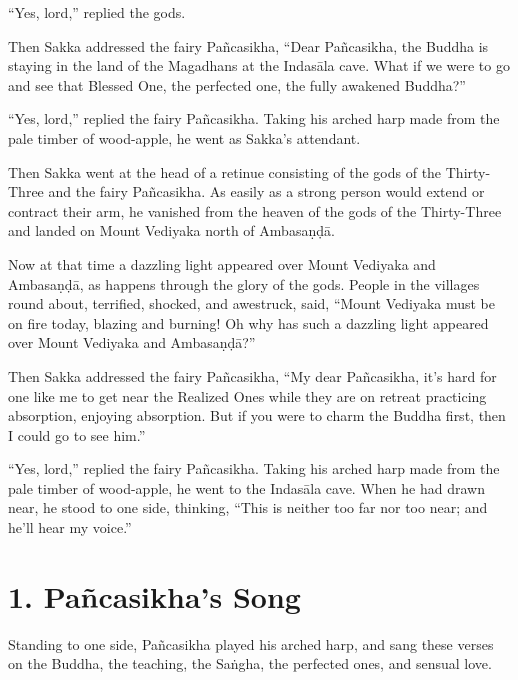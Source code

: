 \documentclass[12pt,openany]{book}%
\begin{document}
“Yes, lord,” replied the gods. 

Then Sakka addressed the fairy \textsanskrit{Pañcasikha}, “Dear \textsanskrit{Pañcasikha}, the Buddha is staying in the land of the Magadhans at the \textsanskrit{Indasāla} cave. What if we were to go and see that Blessed One, the perfected one, the fully awakened Buddha?” 

“Yes, lord,” replied the fairy \textsanskrit{Pañcasikha}. Taking his arched harp made from the pale timber of wood-apple, he went as Sakka’s attendant. 

Then Sakka went at the head of a retinue consisting of the gods of the Thirty-Three and the fairy \textsanskrit{Pañcasikha}. As easily as a strong person would extend or contract their arm, he vanished from the heaven of the gods of the Thirty-Three and landed on Mount Vediyaka north of \textsanskrit{Ambasaṇḍā}. 

Now at that time a dazzling light appeared over Mount Vediyaka and \textsanskrit{Ambasaṇḍā}, as happens through the glory of the gods. People in the villages round about, terrified, shocked, and awestruck, said, “Mount Vediyaka must be on fire today, blazing and burning! Oh why has such a dazzling light appeared over Mount Vediyaka and \textsanskrit{Ambasaṇḍā}?” 

Then Sakka addressed the fairy \textsanskrit{Pañcasikha}, “My dear \textsanskrit{Pañcasikha}, it’s hard for one like me to get near the Realized Ones while they are on retreat practicing absorption, enjoying absorption. But if you were to charm the Buddha first, then I could go to see him.” 

“Yes, lord,” replied the fairy \textsanskrit{Pañcasikha}. Taking his arched harp made from the pale timber of wood-apple, he went to the \textsanskrit{Indasāla} cave. When he had drawn near, he stood to one side, thinking, “This is neither too far nor too near; and he’ll hear my voice.” 

\section*{1. \textsanskrit{Pañcasikha}’s Song }

Standing to one side, \textsanskrit{Pañcasikha} played his arched harp, and sang these verses on the Buddha, the teaching, the \textsanskrit{Saṅgha}, the perfected ones, and sensual love. 
\end{document}
